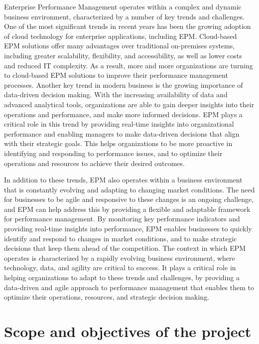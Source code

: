 \documentclass[12pt,a4paper,openright,twoside]{book}
\begin{document}
Enterprise Performance Management operates within a complex and dynamic business environment, characterized by a number of key trends and challenges. 
%
One of the most significant trends in recent years has been the growing adoption of cloud technology for enterprise applications, including EPM. 
%
Cloud-based EPM solutions offer many advantages over traditional on-premises systems, including greater scalability, flexibility, and accessibility, as well as lower costs and reduced IT complexity. 
%
As a result, more and more organizations are turning to cloud-based EPM solutions to improve their performance management processes.
%
Another key trend in modern business is the growing importance of data-driven decision making. 
%
With the increasing availability of data and advanced analytical tools, organizations are able to gain deeper insights into their operations and performance, and make more informed decisions. 
%
EPM plays a critical role in this trend by providing real-time insights into organizational performance and enabling managers to make data-driven decisions that align with their strategic goals. 
%
This helps organizations to be more proactive in identifying and responding to performance issues, and to optimize their operations and resources to achieve their desired outcomes.

In addition to these trends, EPM also operates within a business environment that is constantly evolving and adapting to changing market conditions. 
%
The need for businesses to be agile and responsive to these changes is an ongoing challenge, and EPM can help address this by providing a flexible and adaptable framework for performance management. 
%
By monitoring key performance indicators and providing real-time insights into performance, EPM enables businesses to quickly identify and respond to changes in market conditions, and to make strategic decisions that keep them ahead of the competition.
%
The context in which EPM operates is characterized by a rapidly evolving business environment, where technology, data, and agility are critical to success. 
%
It plays a critical role in helping organizations to adapt to these trends and challenges, by providing a data-driven and agile approach to performance management that enables them to optimize their operations, resources, and strategic decision making.

\section{Scope and objectives of the project}
\end{document}
